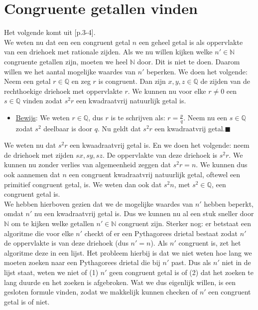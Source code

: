 \documentclass[12pt,reqno]{article}
\newcommand*{\NN}{\ensuremath{\mathbb{N}}}
\newcommand*{\QQ}{\ensuremath{\mathbb{Q}}}
\newcommand*{\QED}{\hfill\ensuremath{\blacksquare}}
\begin{document}
	\section{Congruente getallen vinden}
	Het volgende komt uit \cite{Koblitz}[p.3-4].\\
	We weten nu dat een een congruent getal $n$ een geheel getal is als oppervlakte van een driehoek met rationale zijden. Als we nu willen kijken welke $n'\in\NN$ congruente getallen zijn, moeten we heel $\NN$ door. Dit is niet te doen. Daarom willen we het aantal mogelijke waardes van $n'$ beperken. We doen het volgende:\\
	Neem een getal $r\in\QQ$ en zeg $r$ is congruent. Dan zijn $x,y,z\in\QQ$ de zijden van de rechthoekige driehoek met oppervlakte $r$. We kunnen nu voor elke $r\neq0$ een $s\in\QQ$ vinden zodat $s^2r$ een kwadraatvrij natuurlijk getal is.
	\begin{itemize}
		\item[] \underline{Bewijs}: We weten $r\in\QQ$, dus $r$ is te schrijven als: $r=\frac{p}{q}$. Neem nu een $s\in\QQ$ zodat $s^2$ deelbaar is door $q$. {\color{red}Nu geldt dat $s^2r$ een kwadraatvrij getal.}\QED
	\end{itemize}
	We weten nu dat $s^2r$ een kwaadraatvrij getal is. En we doen het volgende: neem de driehoek met zijden $sx,sy,sz$. De oppervlakte van deze driehoek is $s^2r$. We kunnen nu zonder verlies van algemeenheid zeggen dat $s^2r=n$. We kunnen dus ook aannemen dat $n$ een congruent kwadraatvrij natuurlijk getal, oftewel een primitief congruent getal, is. We weten dan ook dat $s^2n$, met $s^2\in\QQ$, een congruent getal is.  \\
	
	We hebben hierboven gezien dat we de mogelijke waardes van $n'$ hebben beperkt, omdat $n'$ nu een kwadraatvrij getal is. Dus we kunnen nu al een stuk sneller door $\NN$ om te kijken welke getallen $n'\in\NN$ congruent zijn. Sterker nog: er betstaat een algoritme die voor elke $n'$ checkt of er een Pythagorees drietal bestaat zodat $n'$ de oppervlakte is van deze driehoek (dus $n'=n$). Als $n'$ congruent is, zet het algoritme deze in een lijst. Het probleem hierbij is dat we niet weten hoe lang we moeten zoeken naar een Pythagorees drietal die bij $n'$ past. Dus als $n'$ niet in de lijst staat, weten we niet of (1) $n'$ geen congruent getal is of (2) dat het zoeken te lang duurde en het zoeken is afgebroken. Wat we dus eigenlijk willen, is een gesloten formule vinden, zodat we makkelijk kunnen checken of $n'$ een congruent getal is of niet.\\
	
\end{document}
